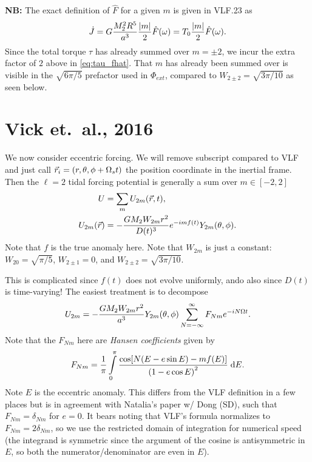 \documentclass[11pt,
        usenames, %
        dvipsnames %
    ]{article}
\DeclarePairedDelimiter\abs{\lvert}{\rvert}
\DeclarePairedDelimiter\p{\lparen}{\rparen}
\DeclarePairedDelimiter\s{\lbrack}{\rbrack}
\begin{document}
\textbf{NB:} The exact definition of $\hat{F}$ for a given $m$ is given in
VLF.23 as
\begin{equation}
    \dot{J} = G\frac{M_2^2R^5}{a^3}\frac{\abs*{m}}{2}\hat{F}(\omega)
        = T_0 \frac{\abs*{m}}{2} \hat{F}(\omega).
\end{equation}
Since the total torque $\tau$ has already summed over $m = \pm 2$, we incur the
extra factor of $2$ above in \autoref{eq:tau_fhat}. That $m$ has already been
summed over is visible in the $\sqrt{6\pi/5}$ prefactor used in $\Phi_{ext}$,
compared to $W_{2\pm 2} = \sqrt{3\pi/10}$ as seen below.

\section{Vick et.\ al., 2016}

We now consider eccentric forcing. We will remove subscript compared to VLF and
just call $\vec{r}_i = \p*{r, \theta, \phi + \Omega_s t}$ the position
coordinate in the inertial frame. Then the $\ell = 2$ tidal forcing potential is
generally a sum over $m \in [-2, 2]$
\begin{align}
    U &= \sum\limits_m U_{2m} \p*{\vec{r}, t},\\
    U_{2m}\p*{\vec{r}} &= -\frac{GM_2 W_{2m} r^2}{D(t)^3}
        e^{-imf(t)} Y_{2m}(\theta, \phi).
\end{align}
Note that $f$ is the true anomaly here. Note that $W_{2m}$ is just a constant:
$W_{20} = \sqrt{\pi/5}$, $W_{2 \pm 1} = 0$, and $W_{2 \pm 2} = \sqrt{3\pi /
10}$.

This is complicated since $f(t)$ does not evolve uniformly, ando also since
$D(t)$ is time-varying! The easiest treatment is to decompose
\begin{equation}
    U_{2m} = -\frac{GM_2W_{2m}r^2}{a^3}Y_{2m}\p*{\theta, \phi}
        \sum\limits_{N = -\infty}^\infty F_{Nm}e^{-iN\Omega t}.
\end{equation}
Note that the $F_{Nm}$ here are \emph{Hansen coefficients} given by
\begin{equation}
    F_{Nm} = \frac{1}{\pi}\int\limits_{0}^{\pi}
        \frac{\cos\s*{N\p*{E - e\sin E} - mf(E)}}
            {\p*{1 - e\cos E}^2}\;\mathrm{d}E.
\end{equation}
Note $E$ is the eccentric anomaly. This differs from the VLF definition in a few
places but is in agreement with Natalia's paper w/ Dong (SD), such that $F_{Nm}
= \delta_{Nm}$ for $e = 0$. It bears noting that VLF's formula normalizes to
$F_{Nm} = 2\delta_{Nm}$, so we use the restricted domain of integration for
numerical speed (the integrand is symmetric since the argument of the cosine is
antisymmetric in $E$, so both the numerator/denominator are even in $E$).
\end{document}
